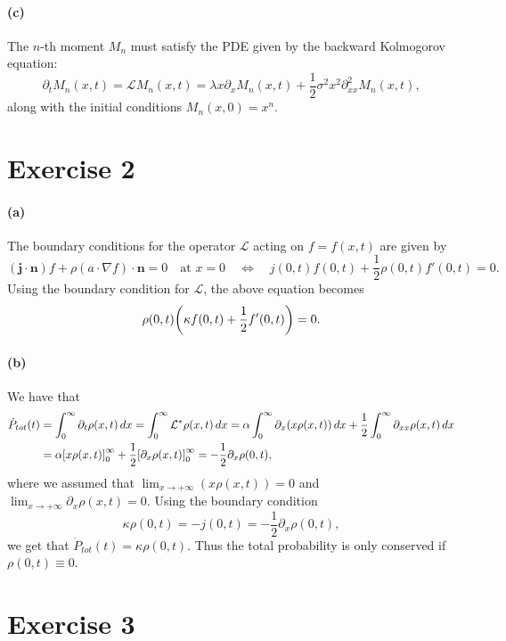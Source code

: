 \documentclass[a4paper,11pt]{article}
\theoremstyle{definition}
\theoremstyle{plain}
\theoremstyle{remark}
\DeclarePairedDelimiter{\parr}{(}{)}
\DeclarePairedDelimiter{\parq}{[}{]}
\begin{document}
\paragraph*{(c)}

The $n$-th moment $M_n$ must satisfy the PDE given by the backward Kolmogorov equation:
$$
\partial_t M_n(x,t) = \mathcal{L} M_n (x,t) = \lambda x\partial_{x}M_n(x,t) + \frac{1}{2}\sigma^2x^2\partial^2_{xx}M_n(x,t),
$$
along with the initial conditions $M_n(x,0) = x^n$.

\section*{Exercise 2}

\paragraph*{(a)}

The boundary conditions for the operator $\mathcal{L}$ acting on $f=f(x,t)$ are given by 
$$
(\mathbf{j}\cdot\mathbf{n})f  + \rho(a \cdot \nabla f)\cdot \mathbf{n} = 0 \quad\text{at } x=0 \quad\Leftrightarrow\quad j(0,t)f(0,t) + \frac{1}{2}\rho(0,t)f'(0,t)=0.
$$
Using the boundary condition for $\mathcal{L}$, the above equation becomes 
$$
\rho(0,t)\parr*{\kappa f(0,t)+ \frac{1}{2}f'(0,t)} = 0.
$$

\paragraph*{(b)}

We have that
\begin{align*}
\dot{P}_{tot}(t) & = \int_0^\infty\partial_t\rho(x,t)\,dx = \int_0^\infty\mathcal{L}^*\rho(x,t)\,dx = \alpha\int_0^\infty\partial_x(x\rho(x,t))\,dx + \frac{1}{2}\int_0^\infty\partial_{xx}\rho(x,t)\,dx \\  & = \alpha\parq*{x\rho(x,t)}_0^\infty + \frac{1}{2}\parq*{\partial_x\rho(x,t)}_0^\infty = -\frac{1}{2}\partial_x\rho(0,t),
\end{align*}
where we assumed that $\lim_{x\to+\infty}(x\rho(x,t))=0$ and $\lim_{x\to+\infty}\partial_x\rho(x,t)=0$.
Using the boundary condition
$$
\kappa \rho(0,t) = -j(0,t) = -\frac{1}{2}\partial_x\rho(0,t),
$$
we get that $\dot{P}_{tot}(t) = \kappa \rho(0,t)$. Thus the total probability is only conserved if $\rho(0,t) \equiv 0$.

\section*{Exercise 3}
\end{document}
